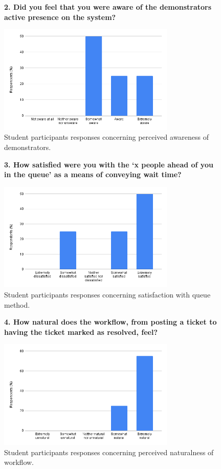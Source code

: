 \begin{figure}[H]
    \centering
    \textbf{2. Did you feel that you were aware of the demonstrators active presence on the system?}\par\medskip
    \includegraphics[width=0.75\textwidth]{10evaluation/images/stud2.png}
    \caption{Student participants responses concerning perceived awareness of demonstrators.}
    \label{fig:stud2}
\end{figure}

\begin{figure}[H]
    \centering
    \textbf{3. How satisfied were you with the `x people ahead of you in the queue' as a means of conveying wait time?}\par\medskip
    \includegraphics[width=0.75\textwidth]{10evaluation/images/stud3.png}
    \caption{Student participants responses concerning satisfaction with queue method.}
    \label{fig:stud3}
\end{figure}

\begin{figure}[H]
    \centering
    \textbf{4. How natural does the workflow, from posting a ticket to having the ticket marked as resolved, feel?}\par\medskip
    \includegraphics[width=0.75\textwidth]{10evaluation/images/stud4.png}
    \caption{Student participants responses concerning perceived naturalness of workflow.}
    \label{fig:stud4}
\end{figure}

